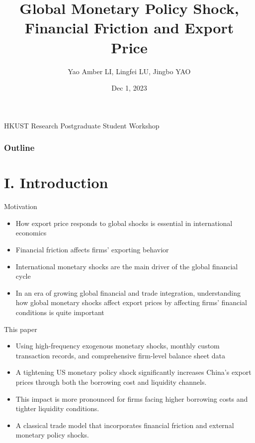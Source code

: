 \documentclass[10pt]{beamer}
\begin{document}
\title{Global Monetary Policy Shock, Financial Friction and Export Price}
\author[Yao Amber LI, Lingfei LU and Jingbo YAO]{Yao Amber LI, Lingfei LU, Jingbo YAO}
\date{Dec 1, 2023}

\begin{frame}
\maketitle
\centering
HKUST Research Postgraduate Student Workshop
\end{frame}

\begin{frame}
\frametitle{Outline}
\tableofcontents
\end{frame}

\section{I. Introduction}

\begin{frame}{Motivation}
\begin{itemize}
    \item How export price responds to global shocks is essential in international economics
    \medskip
    \item Financial friction affects firms' exporting behavior
    \medskip
    \item International monetary shocks are the main driver of the global financial cycle
    \medskip
    \item  In an era of growing global financial and trade integration, understanding how global monetary shocks affect export prices by affecting firms' financial conditions is quite important
    \medskip
\end{itemize}
\end{frame}

\begin{frame}{This paper}
\begin{itemize}
    \item Using high-frequency exogenous monetary shocks, monthly custom transaction records, and comprehensive firm-level balance sheet data
    \medskip
    \item  A tightening US monetary policy shock significantly increases China's export prices through both the borrowing cost and liquidity channels.
    \medskip
    \item This impact is more pronounced for firms facing higher borrowing costs and tighter liquidity conditions. 
    \medskip
    \item A classical trade model that incorporates financial friction and external monetary policy shocks.
\end{itemize}
\end{frame}
\end{document}
